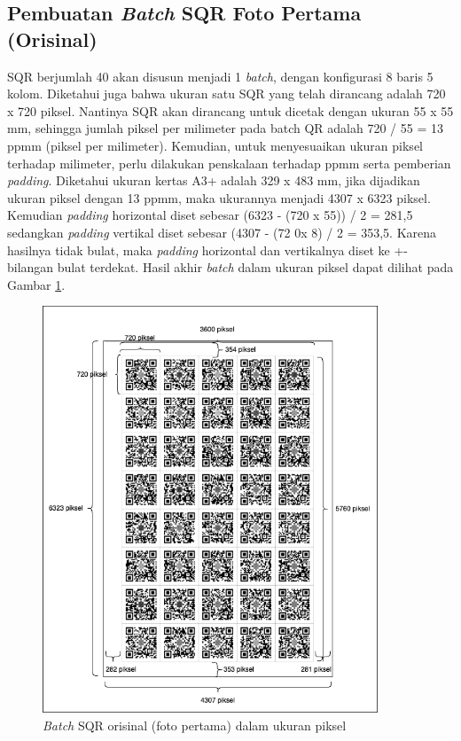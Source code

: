 \subsection{Pembuatan \emph{Batch} SQR Foto Pertama (Orisinal)} \label{Pembuatan Batch SQR Foto Pertama (Orisinal)} SQR berjumlah 40 akan disusun menjadi 1 \emph{batch}, dengan konfigurasi 8
baris 5 kolom. Diketahui juga bahwa ukuran satu SQR yang telah dirancang adalah 720 x 720 piksel. Nantinya SQR akan dirancang untuk dicetak dengan ukuran 55 x
55 mm, sehingga jumlah piksel per milimeter pada batch QR adalah 720 / 55 = 13 ppmm (piksel per milimeter). Kemudian, untuk menyesuaikan ukuran piksel terhadap
milimeter, perlu dilakukan penskalaan terhadap ppmm serta pemberian \emph{padding}. Diketahui ukuran kertas A3+ adalah 329 x 483 mm, jika dijadikan ukuran
piksel dengan 13 ppmm, maka ukurannya menjadi 4307 x 6323 piksel. Kemudian \emph{padding} horizontal diset sebesar (6323 - (720 x 55)) / 2 = 281,5 sedangkan
\emph{padding} vertikal diset sebesar (4307 - (72 0x 8) / 2 = 353,5. Karena hasilnya tidak bulat, maka \emph{padding} horizontal dan vertikalnya diset ke +-
bilangan bulat terdekat. Hasil akhir \emph{batch} dalam ukuran piksel dapat dilihat pada Gambar \ref{Fig: 3-batchqr}.

\begin{figure}[!ht]
	\centering
	\includegraphics[width=10cm]{contents/chapter-3/3-batchqr.png}
	\caption{\emph{Batch} SQR orisinal (foto pertama) dalam ukuran piksel}
	\label{Fig: 3-batchqr}
\end{figure}

